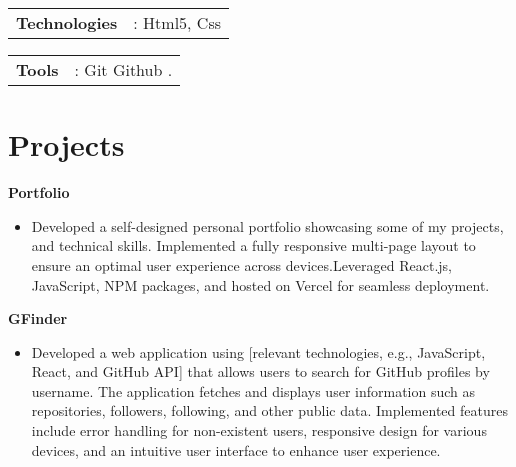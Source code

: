 \documentclass[a4paper,12pt]{article}
\begin{document}
\begin{tabularx}{\linewidth}{ @{}l r@{} }
\textbf{Technologies} & {: Html5, Css} \\[3.75pt]
\end{tabularx}



\begin{tabularx}{\linewidth}{ @{}l r@{} }
\textbf{Tools} & {: Git Github .} \\[3.75pt]
\end{tabularx}



\section{Projects}
\textbf{Portfolio}
\begin{itemize}
    \item Developed a self-designed personal portfolio showcasing some of my projects, and technical skills. Implemented a fully responsive multi-page layout to ensure an optimal user experience across devices.Leveraged React.js, JavaScript, NPM packages, and hosted on Vercel for seamless deployment.
\end{itemize}

\textbf{GFinder}
\begin{itemize}
    \item Developed a web application using [relevant technologies, e.g., JavaScript, React, and GitHub API] that allows users to search for GitHub profiles by username. The application fetches and displays user information such as repositories, followers, following, and other public data. Implemented features include error handling for non-existent users, responsive design for various devices, and an intuitive user interface to enhance user experience.
\end{itemize}
\end{document}
